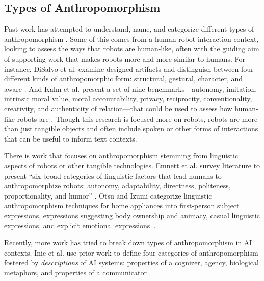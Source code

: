 \subsection{Types of Anthropomorphism }
Past work has attempted to understand, name, and categorize different types of anthropomorphism \cite{emnett2024using}. Some of this comes from a human-robot interaction context, looking to assess the ways that robots are human-like, often with the guiding aim of supporting work that makes robots more and more similar to humans. For instance, DiSalvo et al. examine designed artifacts and distinguish between four different kinds of anthropomorphic form: structural, gestural, character, and aware \cite{disalvo2004kinds}. And Kahn et al. present a set of nine benchmarks---autonomy, imitation, intrinsic moral value, moral accountability, privacy, reciprocity, conventionality, creativity, and authenticity of relation---that could be used to assess how human-like robots are \cite{kahn2007what}. Though this research is focused more on robots, robots are more than just tangible objects and often include spoken or other forms of interactions that can be useful to inform text contexts.

There is work that focuses on anthropomorphism stemming from linguistic aspects of robots or other tangible technologies. Emnett et al. survey literature to present ``six broad categories of linguistic factors that lead humans to anthropomorphize robots: autonomy, adaptability, directness, politeness, proportionality, and humor'' \cite{emnett2024using}. Otsu and Izumi categorize linguistic anthropomorphism techniques for home appliances into first-person subject expressions, expressions suggesting body ownership and animacy, casual linguistic expressions, and explicit emotional expressions~\cite{otsu2022investigation}.

Recently, more work has tried to break down types of anthropomorphism in AI contexts.  Inie et al. use prior work to define four categories of anthropomorphism fostered by \textit{descriptions} of AI systems: properties of a cognizer, agency, biological metaphors, and properties of a communicator \cite{inie2024from}. 

